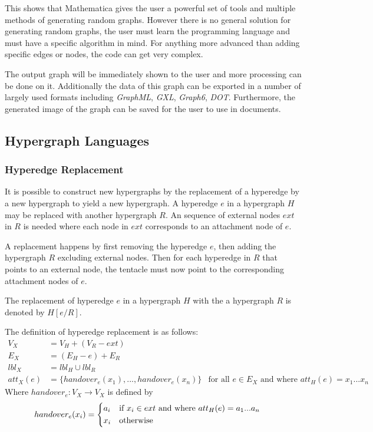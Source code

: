     

    This shows that Mathematica gives the user a powerful set of tools and multiple methods of generating random graphs. However there is no general solution for generating random graphs, the user must learn the programming language and must have a specific algorithm in mind. For anything more advanced than adding specific edges or nodes, the code can get very complex.

    The output graph will be immediately shown to the user and more processing can be done on it. Additionally the data of this graph can be exported in a number of largely used formats including \emph{GraphML}, \emph{GXL}, \emph{Graph6}, \emph{DOT}. Furthermore, the generated image of the graph can be saved for the user to use in documents.

\subsection{Hypergraph Languages}
  \subsubsection{Hyperedge Replacement}

    It is possible to construct new hypergraphs by the replacement of a hyperedge by a new hypergraph to yield a new hypergraph. A hyperedge $e$ in a hypergraph $H$ may be replaced with another hypergraph $R$. An sequence of external nodes $ext$ in $R$ is needed where each node in $ext$ corresponds to an attachment node of $e$.

    A replacement happens by first removing the hyperedge $e$, then adding the hypergraph $R$ excluding external nodes. Then for each hyperedge in $R$ that points to an external node, the tentacle must now point to the corresponding attachment nodes of $e$.

    The replacement of hyperedge $e$ in a hypergraph $H$ with the a hypergraph $R$ is denoted by $H[e/R]$. 

    The definition of hyperedge replacement is as follows:
    \begin{align*}
    V_X &= V_H + (V_R - ext) \\
    E_X &= (E_H - e) + E_R \\
    lbl_X &= lbl_H \cup lbl_R \\
    att_X(e) &= \{handover_e(x_1),...,handover_e(x_n)\} & \text{for all $e \in E_X$ and where $att_H(e) = x_1...x_n$}
    \end{align*}
    Where $handover_e : V_X \to V_X$ is defined by
    \begin{align*}
    handover_e(x_i) &= \begin{dcases*}
    a_i & if $x_i \in ext$ and where $att_H(e) = a_1...a_n$ \\
    x_i & otherwise
    \end{dcases*}
    \end{align*}

